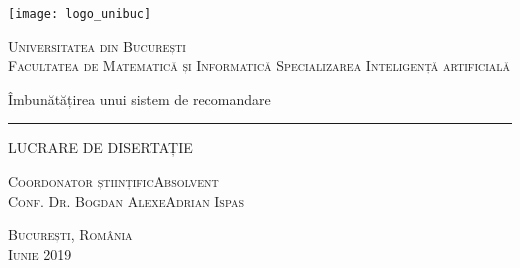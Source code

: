 \begin{titlepage}
	\begin{center}

		\texttt{[image: logo\_unibuc]}

		\vspace{0.5cm}
		\LARGE \textsc{Universitatea din București}
		\\
		\vspace{0.5cm}
		\Large \textsc{Facultatea de Matematică și Informatică}
		\vspace{0.5cm}
		\Large \textsc{Specializarea Inteligență artificială}

		\vfill

		\Huge Îmbunătățirea unui sistem de recomandare
		\rule{\textwidth}{1pt}
		\Large LUCRARE DE DISERTAȚIE

		\vfill

		\Large
		\textsc{Coordonator științific}\hfill \textsc{Absolvent}
		\\
		\large
		\textsc{Conf. Dr. Bogdan Alexe}\hfill \textsc{Adrian Ispas}
	
		\vspace{1.5cm}
		\textsc{București, România}\\
		\textsc{Iunie 2019}

	\end{center}
\end{titlepage}
